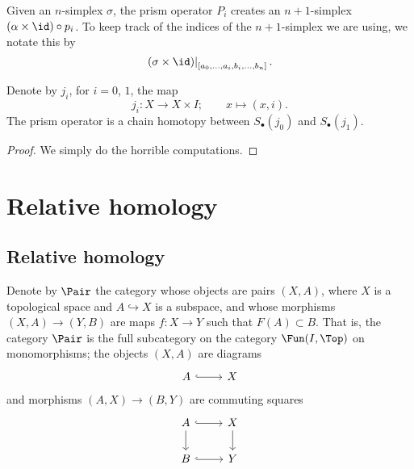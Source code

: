 \documentclass[main.tex]{subfiles}
\begin{document}
Given an \(n\)-simplex \(\sigma\), the prism operator \(P_{i}\) creates an \(n+1\)-simplex \((\alpha \times \id) \circ p_{i}\). To keep track of the indices of the \(n+1\)-simplex we are using, we notate this by
\begin{equation*}
  \left. (\sigma \times \id) \right|_{[a_{0}, \ldots, a_{i}, b_{i}, \ldots, b_{n}]}.
\end{equation*}

\begin{proposition}
  Denote by \(j_{i}\), for \(i = 0\), \(1\), the map
  \begin{equation*}
    j_{i}\colon X \to X \times I;\qquad x \mapsto (x, i).
  \end{equation*}
  The prism operator is a chain homotopy between \(S_{\bullet}(j_{0})\) and \(S_{\bullet}(j_{1})\).
\end{proposition}
\begin{proof}
  We simply do the horrible computations.
\end{proof}

\section{Relative homology}
\label{sec:relative_homology}

\subsection{Relative homology}
\label{ssc:relative_homology}

Denote by $\Pair$ the category whose objects are pairs $(X, A)$, where $X$ is a topological space and $A \hookrightarrow X$ is a subspace, and whose morphisms $(X, A) \to (Y, B)$ are maps $f\colon X \to Y$ such that $F(A) \subset B$. That is, the category \(\Pair\) is the full subcategory on the category \(\Fun(I, \Top)\) on monomorphisms; the objects \((X, A)\) are diagrams
\begin{equation*}
  \begin{tikzcd}
    A
    \arrow[r, hookrightarrow]
    & X
  \end{tikzcd}
\end{equation*}
and morphisms \((A, X) \to (B, Y)\) are commuting squares
\begin{equation*}
  \begin{tikzcd}
    A
    \arrow[r, hookrightarrow]
    \arrow[d]
    & X
    \arrow[d]
    \\
    B
    \arrow[r, hookrightarrow]
    & Y
  \end{tikzcd}
\end{equation*}
\end{document}
